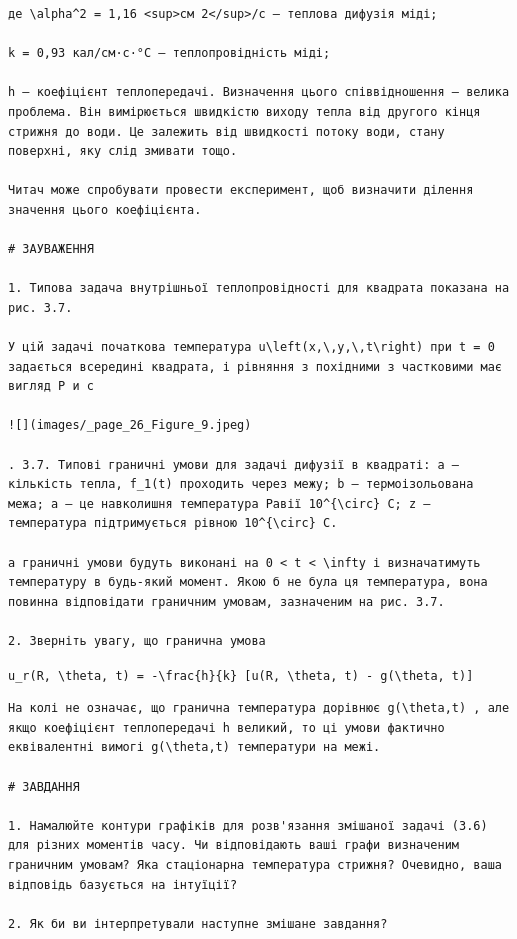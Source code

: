 \documentclass[
  ukrainian,
]{article}
\begin{document}
\begin{verbatim}
де \alpha^2 = 1,16 <sup>см 2</sup>/с — теплова дифузія міді;

k = 0,93 кал/см·с·°C — теплопровідність міді;

h — коефіцієнт теплопередачі. Визначення цього співвідношення — велика проблема. Він вимірюється швидкістю виходу тепла від другого кінця стрижня до води. Це залежить від швидкості потоку води, стану поверхні, яку слід змивати тощо.

Читач може спробувати провести експеримент, щоб визначити ділення значення цього коефіцієнта.

# ЗАУВАЖЕННЯ

1. Типова задача внутрішньої теплопровідності для квадрата показана на рис. 3.7.

У цій задачі початкова температура u\left(x,\,y,\,t\right) при t = 0 задається всередині квадрата, і рівняння з похідними з частковими має вигляд Р и с

![](images/_page_26_Figure_9.jpeg)

. 3.7. Типові граничні умови для задачі дифузії в квадраті: a — кількість тепла, f_1(t) проходить через межу; b — термоізольована межа; a — це навколишня температура Равії 10^{\circ} C; z — температура підтримується рівною 10^{\circ} C.

а граничні умови будуть виконані на 0 < t < \infty і визначатимуть температуру в будь-який момент. Якою б не була ця температура, вона повинна відповідати граничним умовам, зазначеним на рис. 3.7.

2. Зверніть увагу, що гранична умова
\end{verbatim}

\texttt{u\_r(R,\ \textbackslash{}theta,\ t)\ =\ -\textbackslash{}frac\{h\}\{k\}\ {[}u(R,\ \textbackslash{}theta,\ t)\ -\ g(\textbackslash{}theta,\ t){]}}

\begin{verbatim}
На колі не означає, що гранична температура дорівнює g(\theta,t) , але якщо коефіцієнт теплопередачі h великий, то ці умови фактично еквівалентні вимогі g(\theta,t) температури на межі.

# ЗАВДАННЯ

1. Намалюйте контури графіків для розв'язання змішаної задачі (3.6) для різних моментів часу. Чи відповідають ваші графи визначеним граничним умовам? Яка стаціонарна температура стрижня? Очевидно, ваша відповідь базується на інтуїції?

2. Як би ви інтерпретували наступне змішане завдання?
\end{verbatim}
\end{document}

